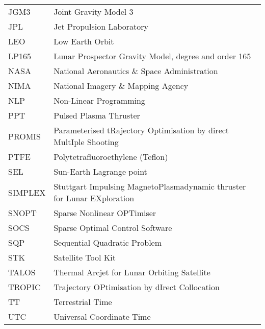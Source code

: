 \begin{longtable}{l p{}}
JGM3 & Joint Gravity Model 3 \\
JPL & Jet Propulsion Laboratory \\
LEO & Low Earth Orbit \\
LP165 & Lunar Prospector Gravity Model, degree and order 165 \\
NASA & National Aeronautics \& Space Administration \\
NIMA & National Imagery \& Mapping Agency \\
NLP & Non-Linear Programming \\
PPT & Pulsed Plasma Thruster \\
PROMIS & Parameterised tRajectory Optimisation by direct MultIple Shooting \\
PTFE & Polytetrafluoroethylene (Teflon) \\
SEL & Sun-Earth Lagrange point \\
SIMPLEX & Stuttgart Impulsing MagnetoPlasmadynamic thruster for Lunar EXploration \\
SNOPT & Sparse Nonlinear OPTimiser \\
SOCS & Sparse Optimal Control Software \\
SQP & Sequential Quadratic Problem \\
STK & Satellite Tool Kit \\
TALOS & Thermal Arcjet for Lunar Orbiting Satellite \\
TROPIC & Trajectory OPtimisation by dIrect Collocation \\
TT & Terrestrial Time \\
UTC & Universal Coordinate Time


\end{longtable}